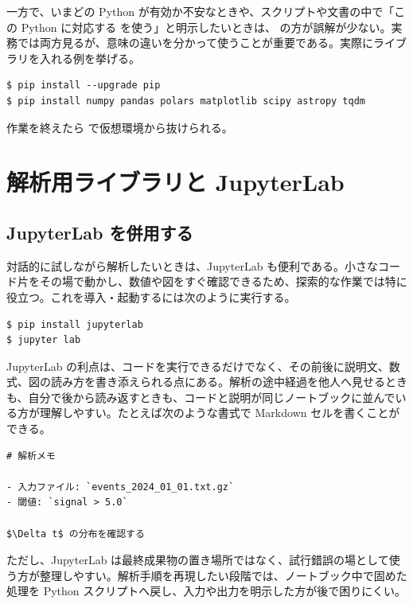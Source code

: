 一方で、いまどの Python が有効か不安なときや、スクリプトや文書の中で「この Python に対応する  を使う」と明示したいときは、 の方が誤解が少ない。実務では両方見るが、意味の違いを分かって使うことが重要である。実際にライブラリを入れる例を挙げる。

\begin{lstlisting}[numbers=none, xleftmargin=2\zw]
$ pip install --upgrade pip
$ pip install numpy pandas polars matplotlib scipy astropy tqdm
\end{lstlisting}

作業を終えたら  で仮想環境から抜けられる。

\section{解析用ライブラリと JupyterLab}

\subsection{JupyterLab を併用する}

対話的に試しながら解析したいときは、JupyterLab も便利である。小さなコード片をその場で動かし、数値や図をすぐ確認できるため、探索的な作業では特に役立つ。これを導入・起動するには次のように実行する。

\begin{lstlisting}[numbers=none, xleftmargin=2\zw]
$ pip install jupyterlab
$ jupyter lab
\end{lstlisting}

JupyterLab の利点は、コードを実行できるだけでなく、その前後に説明文、数式、図の読み方を書き添えられる点にある。解析の途中経過を他人へ見せるときも、自分で後から読み返すときも、コードと説明が同じノートブックに並んでいる方が理解しやすい。たとえば次のような書式で Markdown セルを書くことができる。

\begin{lstlisting}[numbers=none, xleftmargin=2\zw]
# 解析メモ

- 入力ファイル: `events_2024_01_01.txt.gz`
- 閾値: `signal > 5.0`

$\Delta t$ の分布を確認する
\end{lstlisting}

ただし、JupyterLab は最終成果物の置き場所ではなく、試行錯誤の場として使う方が整理しやすい。解析手順を再現したい段階では、ノートブック中で固めた処理を Python スクリプトへ戻し、入力や出力を明示した方が後で困りにくい。

